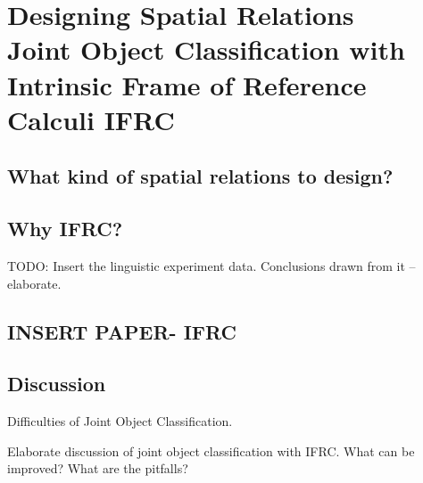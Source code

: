 \chapter[]{Designing Spatial Relations\\ {\Large Joint Object Classification with Intrinsic Frame of Reference Calculi IFRC}}
\label{chap:ifrc}

\section{What kind of spatial relations to design?}
\section{Why IFRC?}
TODO: Insert the linguistic experiment data. Conclusions drawn from it -- elaborate.
\section{INSERT PAPER- IFRC}
\section{Discussion}
Difficulties of Joint Object Classification.

Elaborate discussion of joint object classification with IFRC. What can be 
improved? What are the pitfalls?
